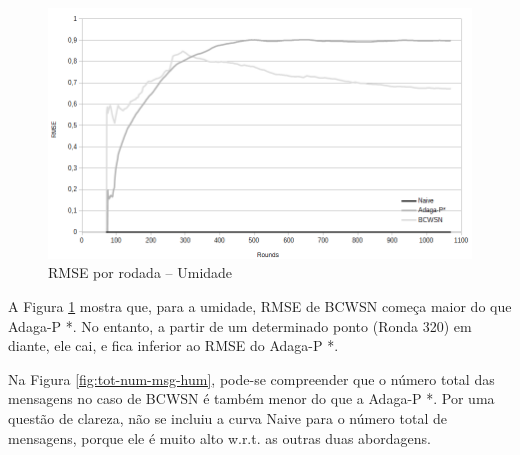 \documentclass{acm_proc_article-sp}
\begin{document}
\begin{figure}[!htb]
\begin{center}
	\includegraphics[scale=0.28]{BCWSN-RMSExRound-BW-Hum.png}
	 \vspace*{-.6cm}
	 \caption{RMSE por rodada – Umidade}
    \label{fig:rmse-hum}
\end{center}
\end{figure}

A Figura \ref{fig:rmse-hum} mostra que, para a umidade, RMSE de BCWSN 
começa maior do que Adaga-P *. No entanto, a partir de um determinado ponto
(Ronda 320) em diante, ele cai, e fica inferior ao RMSE do Adaga-P *.
\vspace*{-.3cm}

Na Figura \ref{fig:tot-num-msg-hum}, pode-se compreender que o número total das mensagens no caso
de BCWSN é também menor do que a Adaga-P *. {Por uma questão de clareza,
não se incluiu a curva Naive para o número total de mensagens, porque ele
é muito alto w.r.t. as outras duas abordagens.}
\vspace*{-.3cm}
\end{document}
